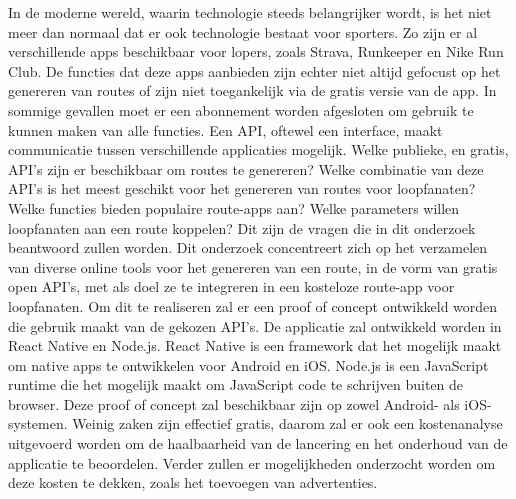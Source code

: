 In de moderne wereld,
waarin tech\-no\-lo\-gie \@ steeds belangrijker wordt,
is het niet meer dan normaal dat er ook technologie bestaat voor sporters.
Zo zijn er al verschillende apps beschikbaar voor lopers, zoals Strava, Runkeeper en Nike Run Club.
De functies dat deze apps aanbieden zijn echter niet altijd gefocust op het genereren van routes of zijn niet toegankelijk via de gratis versie van de app.
In sommige gevallen moet er een abonnement worden afgesloten om gebruik te kunnen maken van alle functies. Een API, oftewel een interface, maakt communicatie tussen verschillende applicaties mogelijk.
Welke publieke, en gratis, API's zijn er beschikbaar om routes te genereren? Welke combinatie van deze API's is het meest geschikt voor het genereren van routes voor loopfanaten? Welke functies bieden populaire route-apps aan? Welke parameters willen loopfanaten aan een route koppelen? Dit zijn de vragen die in dit onderzoek beantwoord zullen worden.
Dit onderzoek concentreert zich op het verzamelen van diverse online tools voor het genereren van een route, in de vorm van gratis open API's, met als doel ze te integreren in een kosteloze route-app voor loopfanaten.
Om dit te realiseren zal er een proof of concept ontwikkeld worden die gebruik maakt van de gekozen API's. De applicatie zal ontwikkeld worden in React Native en Node.js. React Native is een framework dat het mogelijk maakt om native apps te ontwikkelen voor Android en iOS\@. Node.js is een JavaScript runtime die het mogelijk maakt om JavaScript code te schrijven buiten de browser.
Deze proof of concept zal beschikbaar zijn op zowel Android- als iOS-systemen. Weinig zaken zijn effectief gratis, daarom zal er ook een kostenanalyse uitgevoerd worden om de haalbaarheid van de lancering en het onderhoud van de applicatie te beoordelen.
Verder zullen er mogelijkheden onderzocht worden om deze kosten te dekken, zoals het toevoegen van advertenties.



\section{}%
\label{sec:onderzoeksvraag}

